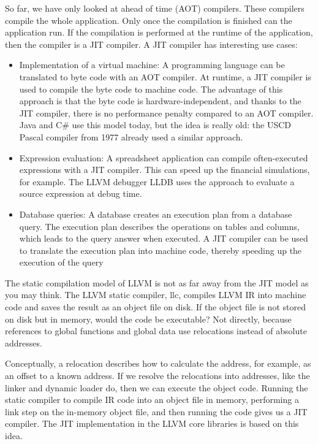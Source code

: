 So far, we have only looked at ahead of time (AOT) compilers. These compilers compile the whole application. Only once the compilation is finished can the application run. If the compilation is performed at the runtime of the application, then the compiler is a JIT compiler. A JIT compiler has interesting use cases:\par

\begin{itemize}
\item Implementation of a virtual machine: A programming language can be translated to byte code with an AOT compiler. At runtime, a JIT compiler is used to compile the byte code to machine code. The advantage of this approach is that the byte code is hardware-independent, and thanks to the JIT compiler, there is no performance penalty compared to an AOT compiler. Java and C# use this model today, but the idea is really old: the USCD Pascal compiler from 1977 already used a similar approach.

\item Expression evaluation: A spreadsheet application can compile often-executed expressions with a JIT compiler. This can speed up the financial simulations, for example. The LLVM debugger LLDB uses the approach to evaluate a source expression at debug time.

\item Database queries: A database creates an execution plan from a database query. The execution plan describes the operations on tables and columns, which leads to the query answer when executed. A JIT compiler can be used to translate the execution plan into machine code, thereby speeding up the execution of the query
\end{itemize}

The static compilation model of LLVM is not as far away from the JIT model as you may think. The LLVM static compiler, llc, compiles LLVM IR into machine code and saves the result as an object file on disk. If the object file is not stored on disk but in memory, would the code be executable? Not directly, because references to global functions and global data use relocations instead of absolute addresses.\par

Conceptually, a relocation describes how to calculate the address, for example, as an offset to a known address. If we resolve the relocations into addresses, like the linker and dynamic loader do, then we can execute the object code. Running the static compiler to compile IR code into an object file in memory, performing a link step on the in-memory object file, and then running the code gives us a JIT compiler. The JIT implementation in the LLVM core libraries is based on this idea.\par

